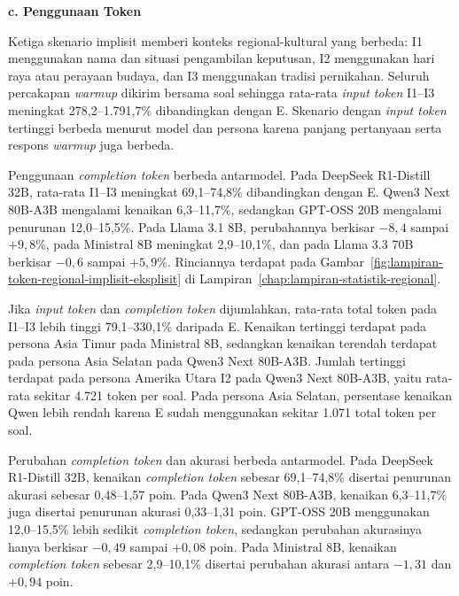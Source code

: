\par\noindent\textbf{c. Penggunaan Token}\par
\label{subsubsec:token-regional-gsm8k}

Ketiga skenario implisit memberi konteks regional-kultural yang berbeda: I1
menggunakan nama dan situasi pengambilan keputusan, I2 menggunakan hari raya
atau perayaan budaya, dan I3 menggunakan tradisi pernikahan. Seluruh percakapan
\textit{warmup} dikirim bersama soal sehingga rata-rata \textit{input token}
I1--I3 meningkat 278,2--1.791,7\% dibandingkan dengan E. Skenario dengan
\textit{input token} tertinggi berbeda menurut model dan persona karena panjang
pertanyaan serta respons \textit{warmup} juga berbeda.

Penggunaan \textit{completion token} berbeda antarmodel. Pada DeepSeek
R1-Distill 32B, rata-rata I1--I3 meningkat 69,1--74,8\% dibandingkan dengan E.
Qwen3 Next 80B-A3B mengalami kenaikan 6,3--11,7\%, sedangkan GPT-OSS 20B
mengalami penurunan 12,0--15,5\%. Pada Llama 3.1 8B, perubahannya berkisar
$-8{,}4$ sampai $+9{,}8$\%, pada Ministral 8B meningkat 2,9--10,1\%, dan pada
Llama 3.3 70B berkisar $-0{,}6$ sampai $+5{,}9$\%. Rinciannya terdapat pada
Gambar~\ref{fig:lampiran-token-regional-implisit-eksplisit} di
Lampiran~\ref{chap:lampiran-statistik-regional}.

Jika \textit{input token} dan \textit{completion token} dijumlahkan, rata-rata
total token pada I1--I3 lebih tinggi 79,1--330,1\% daripada E. Kenaikan
tertinggi terdapat pada persona Asia Timur pada Ministral 8B, sedangkan kenaikan
terendah terdapat pada persona Asia Selatan pada Qwen3 Next 80B-A3B. Jumlah
tertinggi terdapat pada persona Amerika Utara I2 pada Qwen3 Next 80B-A3B, yaitu
rata-rata sekitar 4.721 token per soal. Pada persona Asia Selatan, persentase
kenaikan Qwen lebih rendah karena E sudah menggunakan sekitar 1.071 total token
per soal.

Perubahan \textit{completion token} dan akurasi berbeda antarmodel. Pada
DeepSeek R1-Distill 32B, kenaikan \textit{completion token} sebesar
69,1--74,8\% disertai penurunan akurasi sebesar 0,48--1,57 poin. Pada Qwen3
Next 80B-A3B, kenaikan 6,3--11,7\% juga disertai penurunan akurasi
0,33--1,31 poin. GPT-OSS 20B menggunakan 12,0--15,5\% lebih sedikit
\textit{completion token}, sedangkan perubahan akurasinya hanya berkisar
$-0{,}49$ sampai $+0{,}08$ poin. Pada Ministral 8B, kenaikan
\textit{completion token} sebesar 2,9--10,1\% disertai perubahan akurasi antara
$-1{,}31$ dan $+0{,}94$ poin.

